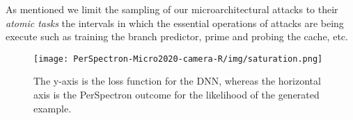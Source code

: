 As mentioned we limit the sampling of our microarchitectural attacks to their {\em atomic tasks} the intervals in which the essential operations of attacks are being execute such as training the branch predictor, prime and probing the cache, etc.  

\begin{figure}[ht!] 
\centering
\texttt{[image: PerSpectron-Micro2020-camera-R/img/saturation.png]}
\vspace*{-4mm}
\caption{ The y-axis is the loss function for the DNN, whereas the horizontal axis is the PerSpectron outcome for the likelihood of the generated example.  
}
\label{fig:sature}
\end{figure}